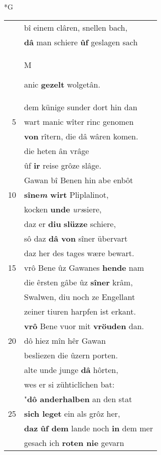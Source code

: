 \documentclass[8pt,a4paper,notitlepage]{article}
\begin{document}
\newpage
\begin{table}[ht]
\begin{minipage}[t]{0.5\linewidth}
\small
\begin{center}*G
\end{center}
\begin{tabular}{rl}
 & bî einem clâren, snellen bach,\\ 
 & \textbf{dâ} man schiere \textbf{ûf} geslagen sach\\ 
 & \begin{large}M\end{large}anic \textbf{gezelt} wolgetân.\\ 
 & dem künige sunder dort hin dan\\ 
5 & wart manic wîter rinc genomen\\ 
 & \textbf{von} rîtern, die dâ wâren komen.\\ 
 & die heten ân vrâge\\ 
 & ûf \textbf{ir} reise grôze slâge.\\ 
 & Gawan bî Benen hin abe enbôt\\ 
10 & \textbf{sîne\textit{m} wirt} Pliplalinot,\\ 
 & kocken \textbf{unde} \textit{urs}siere,\\ 
 & daz er \textbf{diu} \textbf{slüzze} schiere,\\ 
 & sô daz \textbf{dâ von} sîner übervart\\ 
 & daz her des tages wære bewart.\\ 
15 & vrô Bene ûz Gawanes \textbf{hende} nam\\ 
 & die êrsten gâbe ûz \textbf{sîner} krâm,\\ 
 & Swalwen, diu noch ze Engellant\\ 
 & zeiner tiuren harpfen ist erkant.\\ 
 & \textbf{vrô} Bene vuor mit \textbf{vröuden} dan.\\ 
20 & dô hiez mîn hêr Gawan\\ 
 & besliezen die ûzern porten.\\ 
 & alte unde junge \textbf{dâ} hôrten,\\ 
 & wes er si zühticlîchen bat:\\ 
 & "\textbf{dô anderhalben} an den stat\\ 
25 & \textbf{sich leget} ein als grôz her,\\ 
 & \textbf{daz} \textbf{ûf dem} lande noch \textbf{in} dem mer\\ 
 & gesach ich \textbf{roten nie} gevarn\\ 

\end{tabular}
\end{minipage}
\end{table}
\end{document}
